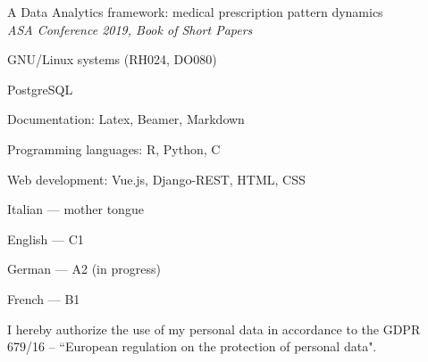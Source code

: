 
A Data Analytics framework: medical prescription pattern dynamics \\
\textit{ASA Conference 2019, Book of Short Papers}



\divider


\divider


\divider


\medskip


GNU/Linux systems (RH024, DO080)

\divider

PostgreSQL

\divider

Documentation: Latex, Beamer, Markdown

\divider

Programming languages: R, Python, C

\divider

Web development: Vue.js, Django-REST, HTML, CSS

\medskip


Italian --- mother tongue

\divider

English --- C1

\divider

German --- A2 (in progress)

\divider

French --- B1

\cvsection{}
I hereby authorize the use of my personal data in accordance to the GDPR 679/16 – “European regulation on the protection of personal data".